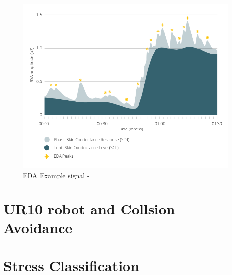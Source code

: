 \begin{figure}[hb]
	\centering
	\includegraphics[width=\columnwidth]{images/EDA-example-graph.png}
	\caption{EDA Example signal - \parencite{eda}}
	\label{fig:eda sig}
\end{figure}



\section{UR10 robot and Collsion Avoidance }

\section{Stress Classification}


